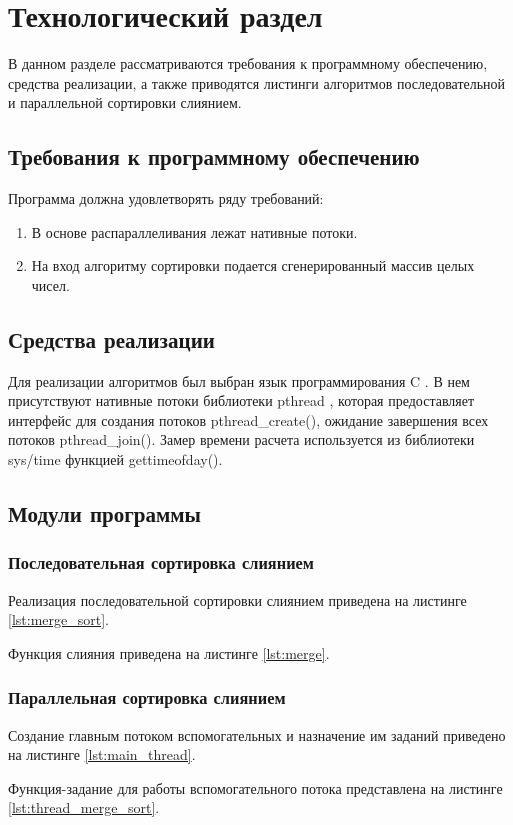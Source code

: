 \chapter{Технологический раздел}
В данном разделе рассматриваются требования к программному обеспечению, средства реализации, а также приводятся листинги алгоритмов последовательной и параллельной сортировки слиянием.

\section{Требования к программному обеспечению}
Программа должна удовлетворять ряду требований:
\begin{enumerate}
	\item В основе распараллеливания лежат нативные потоки.
	\item На вход алгоритму сортировки подается сгенерированный массив целых чисел. 
\end{enumerate}

\section{Средства реализации}
Для реализации алгоритмов был выбран язык программирования C \cite{си}. В нем присутствуют нативные потоки библиотеки pthread \cite{pthread}, которая предоставляет интерфейс для создания потоков pthread\_create(), ожидание завершения всех потоков pthread\_join(). Замер времени расчета используется из библиотеки sys/time \cite{time} функцией gettimeofday().

\section{Модули программы}
\subsection{Последовательная сортировка слиянием}
Реализация последовательной сортировки слиянием приведена на листинге \ref{lst:merge_sort}.

\newpage
Функция слияния приведена на листинге \ref{lst:merge}.


\subsection{Параллельная сортировка слиянием}
Создание главным потоком вспомогательных и назначение им заданий приведено на листинге \ref{lst:main_thread}.

\newpage
Функция-задание для работы вспомогательного потока представлена на листинге \ref{lst:thread_merge_sort}.


